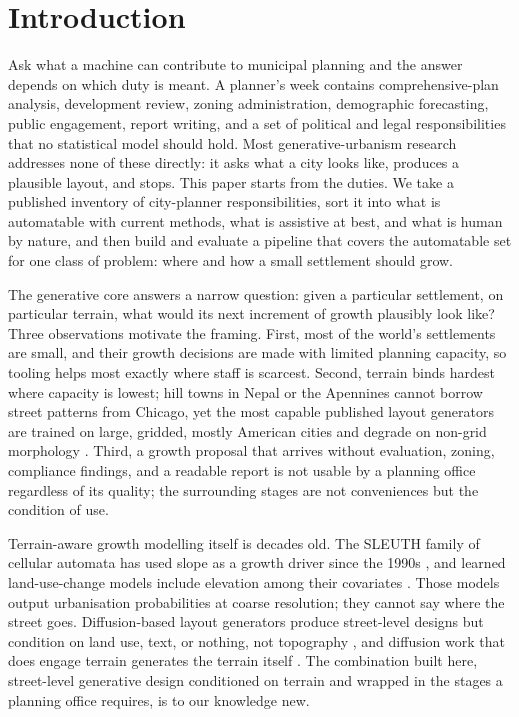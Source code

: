 \documentclass[11pt]{article}
\begin{document}
\section{Introduction}

Ask what a machine can contribute to municipal planning and the answer
depends on which duty is meant. A planner's week contains
comprehensive-plan analysis, development review, zoning administration,
demographic forecasting, public engagement, report writing, and a set
of political and legal responsibilities that no statistical model
should hold. Most generative-urbanism research addresses none of these
directly: it asks what a city looks like, produces a plausible layout,
and stops. This paper starts from the duties. We take a published
inventory of city-planner responsibilities, sort it into what is
automatable with current methods, what is assistive at best, and what
is human by nature, and then build and evaluate a pipeline that covers
the automatable set for one class of problem: where and how a small
settlement should grow.

The generative core answers a narrow question: given a particular
settlement, on particular terrain, what would its next increment of
growth plausibly look like? Three observations motivate the framing.
First, most of the world's settlements are small, and their growth
decisions are made with limited planning capacity, so tooling helps
most exactly where staff is scarcest. Second, terrain binds hardest
where capacity is lowest; hill towns in Nepal or the Apennines cannot
borrow street patterns from Chicago, yet the most capable published
layout generators are trained on large, gridded, mostly American
cities \citep{he2025stepwise, xie2023citygen, he2023globalmapper} and
degrade on non-grid morphology \citep{jiang2025dcgan}. Third, a growth
proposal that arrives without evaluation, zoning, compliance findings,
and a readable report is not usable by a planning office regardless of
its quality; the surrounding stages are not conveniences but the
condition of use.

Terrain-aware growth modelling itself is decades old. The SLEUTH
family of cellular automata has used slope as a growth driver since
the 1990s \citep{clarke1998sleuth}, and learned land-use-change models
include elevation among their covariates
\citep{chughtai2024casurvey}. Those models output urbanisation
probabilities at coarse resolution; they cannot say where the street
goes. Diffusion-based layout generators produce street-level designs
but condition on land use, text, or nothing, not topography
\citep{he2025stepwise, espinosa2023scotland, wang2025satellite}, and
diffusion work that does engage terrain generates the terrain itself
\citep{borne2025mesa, hu2023tdn}. The combination built here,
street-level generative design conditioned on terrain and wrapped in
the stages a planning office requires, is to our knowledge new.
\end{document}
